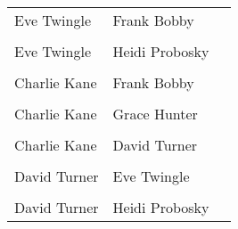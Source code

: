 \documentclass[border=1mm]{standalone}
\begin{document}
\begin{table}[!h]
\begin{tabular}[t]{ll>{\raggedleft\arraybackslash}p{1.5cm}}
\addlinespace
Eve Twingle & Frank Bobby & \cellcolor[HTML]{482979}{\textcolor{white}{-0.62}}\\
\cellcolor{gray!10}{Eve Twingle} & \cellcolor{gray!10}{Grace Hunter} & \cellcolor[HTML]{ECE51B}{\textcolor{white}{\cellcolor{gray!10}{0.94}}}\\
Eve Twingle & Heidi Probosky & \cellcolor[HTML]{D5E21A}{\textcolor{white}{0.88}}\\
\cellcolor{gray!10}{Grace Hunter} & \cellcolor{gray!10}{Heidi Probosky} & \cellcolor[HTML]{A5DB36}{\textcolor{white}{\cellcolor{gray!10}{0.75}}}\\
Charlie Kane & Frank Bobby & \cellcolor[HTML]{3D4E8A}{\textcolor{white}{-0.40}}\\
\addlinespace
\cellcolor{gray!10}{Charlie Kane} & \cellcolor{gray!10}{Eve Twingle} & \cellcolor[HTML]{3A548C}{\textcolor{white}{\cellcolor{gray!10}{-0.36}}}\\
Charlie Kane & Grace Hunter & \cellcolor[HTML]{424186}{\textcolor{white}{-0.48}}\\
\cellcolor{gray!10}{Charlie Kane} & \cellcolor{gray!10}{Heidi Probosky} & \cellcolor[HTML]{2A788E}{\textcolor{white}{\cellcolor{gray!10}{-0.10}}}\\
Charlie Kane & David Turner & \cellcolor[HTML]{FDE725}{\textcolor{white}{0.99}}\\
\cellcolor{gray!10}{David Turner} & \cellcolor{gray!10}{Frank Bobby} & \cellcolor[HTML]{375A8C}{\textcolor{white}{\cellcolor{gray!10}{-0.32}}}\\
\addlinespace
David Turner & Eve Twingle & \cellcolor[HTML]{3F4889}{\textcolor{white}{-0.43}}\\
\cellcolor{gray!10}{David Turner} & \cellcolor{gray!10}{Grace Hunter} & \cellcolor[HTML]{463480}{\textcolor{white}{\cellcolor{gray!10}{-0.56}}}\\
David Turner & Heidi Probosky & \cellcolor[HTML]{2E6D8E}{\textcolor{white}{-0.18}}\\
\bottomrule
\end{tabular}
\end{table}
\end{document}

